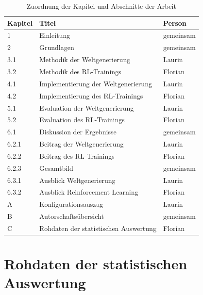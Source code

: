 \documentclass[
  a4paper,
  11pt,
  twoside,
  BCOR=8mm,           %
  headings=big,
  numbers=noenddot,
  listof=totoc,       %
  captions=tableheading,
]{scrreprt}
\begin{document}
\begin{table}[htbp]
    \centering
    \caption{Zuordnung der Kapitel und Abschnitte der Arbeit}
    \label{tab:autorschaft}
    \begin{tabular}{p{2.6cm}p{7.8cm}p{3.0cm}}
        \toprule
        \textbf{Kapitel} & \textbf{Titel} & \textbf{Person} \\
        \midrule
        1 & Einleitung & gemeinsam \\
        2 & Grundlagen & gemeinsam \\
        3.1 & Methodik der Weltgenerierung & Laurin \\
        3.2 & Methodik des RL-Trainings & Florian \\
        4.1 & Implementierung der Weltgenerierung & Laurin \\
        4.2 & Implementierung des RL-Trainings & Florian \\
        5.1 & Evaluation der Weltgenerierung & Laurin \\
        5.2 & Evaluation des RL-Trainings & Florian \\
        6.1 & Diskussion der Ergebnisse & gemeinsam \\
        6.2.1 & Beitrag der Weltgenerierung & Laurin \\
        6.2.2 & Beitrag des RL-Trainings & Florian \\
        6.2.3 & Gesamtbild & gemeinsam \\
        6.3.1 & Ausblick Weltgenerierung & Laurin \\
        6.3.2 & Ausblick Reinforcement Learning & Florian \\
        A & Konfigurationsauszug & Laurin \\
        B & Autorschaftsübersicht & gemeinsam \\
        C & Rohdaten der statistischen Auswertung & Florian \\
        \bottomrule
    \end{tabular}
\end{table}


\chapter{Rohdaten der statistischen Auswertung}
\label{chap:anhang_rohdaten}
\end{document}
